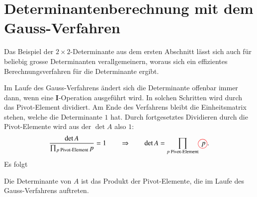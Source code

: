 %
%
%
\section{Determinantenberechnung mit dem Gauss-Verfahren}
Das Beispiel der $2\times 2$-Determinante aus dem ersten Abschnitt
lässt sich auch für beliebig grosse Determinanten verallgemeinern,
woraus sich ein effizientes Berechnungsverfahren für die Determinante
ergibt.

Im Laufe des Gauss-Verfahrens ändert sich die Determinante offenbar
immer dann, wenn eine {\bf I}-Operation ausgeführt wird.
In solchen Schritten wird durch das Pivot-Element dividiert.
Am Ende des 
Verfahrens bleibt die Einheitsmatrix stehen, welche die Determinante
$1$ hat.
Durch fortgesetztes Dividieren durch die Pivot-Elemente wird
aus der $\det A$ also $1$:
\[
\frac{\det A}{\prod_{\text{$p$ Pivot-Element} }p}=1\qquad\Rightarrow
\qquad
\det A=\prod_{\text{$p$ Pivot-Element}} p%
\begin{picture}(0,0)
\color{red}\put(-4,2){\circle{13}}
\end{picture}%
\;.
\]
Es folgt
\begin{satz}
\label{detprodpivot}
Die Determinante von $A$ ist das Produkt der Pivot-Elemente,
die im Laufe des Gauss-Verfahrens auftreten.
\end{satz}

